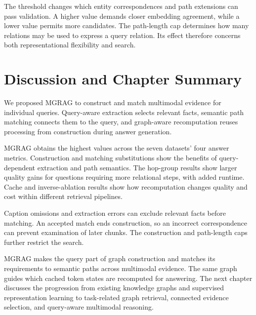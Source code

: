 The threshold changes which entity correspondences and path extensions can pass validation. A higher value demands closer embedding agreement, while a lower value permits more candidates. The path-length cap determines how many relations may be used to express a query relation. Its effect therefore concerns both representational flexibility and search.

\section{Discussion and Chapter Summary}
\label{sec:mgrag:discussion}

We proposed MGRAG to construct and match multimodal evidence for individual queries. Query-aware extraction selects relevant facts, semantic path matching connects them to the query, and graph-aware recomputation reuses processing from construction during answer generation.

MGRAG obtains the highest values across the seven datasets' four answer metrics. Construction and matching substitutions show the benefits of query-dependent extraction and path semantics. The hop-group results show larger quality gains for questions requiring more relational steps, with added runtime. Cache and inverse-ablation results show how recomputation changes quality and cost within different retrieval pipelines.

Caption omissions and extraction errors can exclude relevant facts before matching. An accepted match ends construction, so an incorrect correspondence can prevent examination of later chunks. The construction and path-length caps further restrict the search.

MGRAG makes the query part of graph construction and matches its requirements to semantic paths across multimodal evidence. The same graph guides which cached token states are recomputed for answering. The next chapter discusses the progression from existing knowledge graphs and supervised representation learning to task-related graph retrieval, connected evidence selection, and query-aware multimodal reasoning.
